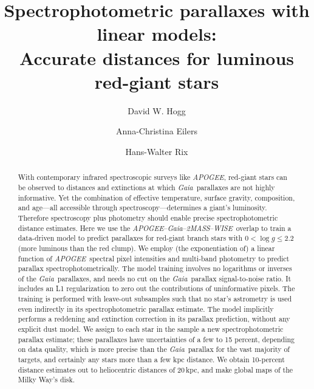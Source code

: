 \documentclass[modern]{aastex62}
\newcommand{\acronym}[1]{{\small{#1}}}
\newcommand{\project}[1]{\textsl{#1}}
\newcommand{\apogee}{\project{\acronym{APOGEE}}}
\newcommand{\gaia}{\project{Gaia}}
\newcommand{\wise}{\project{\acronym{WISE}}}
\newcommand{\zmass}{\project{\acronym{2MASS}}}
\newcommand{\logg}{\log g}
\begin{document}
\sloppy\sloppypar\raggedbottom\frenchspacing %

\title{\textbf{%
Spectrophotometric parallaxes with linear models:\\
Accurate distances for luminous red-giant stars
}}

\author[0000-0003-2866-9403]{David W. Hogg}

\author[0000-0003-2895-6218]{Anna-Christina Eilers}

\author[0000-0003-4996-9069]{Hans-Walter Rix}

\begin{abstract}\noindent
With contemporary infrared spectroscopic surveys like \apogee,
red-giant stars can be observed to distances and extinctions
at which \gaia\ parallaxes are not highly informative.
Yet the combination of effective temperature, surface gravity, composition, and age---all
accessible through spectroscopy---determines a giant's luminosity.
Therefore spectroscopy plus photometry should enable 
precise spectrophotometric distance estimates.
Here we use the \apogee--\gaia--\zmass--\wise\ overlap to train a data-driven model
to predict parallaxes for red-giant branch stars with $0<\logg\leq2.2$ (more luminous
than the red clump).
We employ (the exponentiation of)
a linear function of \apogee\ spectral pixel intensities and multi-band photometry
to predict parallax spectrophotometrically.
The model training involves no logarithms or inverses of the \gaia\ parallaxes,
and needs no cut on the \gaia\ parallax signal-to-noise ratio.
It includes an L1 regularization to zero out the contributions of
uninformative pixels.
The training is performed
with leave-out subsamples such that no star's astrometry is used even indirectly in its
spectrophotometric parallax estimate.
The model implicitly performs a reddening and extinction correction in its parallax prediction,
without any explicit dust model.
We assign to each star in the sample a new spectrophotometric parallax estimate;
these parallaxes have uncertainties of a few to 15 percent, depending on data quality,
which is more precise than the \gaia\ parallax for the vast majority of targets, and
certainly any stars more than a few kpc distance.
We obtain 10-percent distance estimates out to heliocentric distances of 20\,kpc,
and make global maps of the Milky Way's disk.
\end{abstract}
\end{document}
